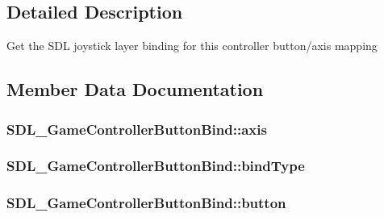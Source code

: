 \subsection{Detailed Description}
Get the S\-D\-L joystick layer binding for this controller button/axis mapping 

\subsection{Member Data Documentation}
\hypertarget{struct_s_d_l___game_controller_button_bind_a2ffbc482f5aadcbb8df97d406708f456}{
\subsubsection[{axis}]{ S\-D\-L\-\_\-\-Game\-Controller\-Button\-Bind\-::axis}}\label{struct_s_d_l___game_controller_button_bind_a2ffbc482f5aadcbb8df97d406708f456}
\hypertarget{struct_s_d_l___game_controller_button_bind_a032fd941b0e8e5e2cdf52b7597f559b9}{
\subsubsection[{bind\-Type}]{ S\-D\-L\-\_\-\-Game\-Controller\-Button\-Bind\-::bind\-Type}}\label{struct_s_d_l___game_controller_button_bind_a032fd941b0e8e5e2cdf52b7597f559b9}
\hypertarget{struct_s_d_l___game_controller_button_bind_a2657029cfc39aa91b5b5342d4a037d95}{
\subsubsection[{button}]{ S\-D\-L\-\_\-\-Game\-Controller\-Button\-Bind\-::button}}\label{struct_s_d_l___game_controller_button_bind_a2657029cfc39aa91b5b5342d4a037d95}
